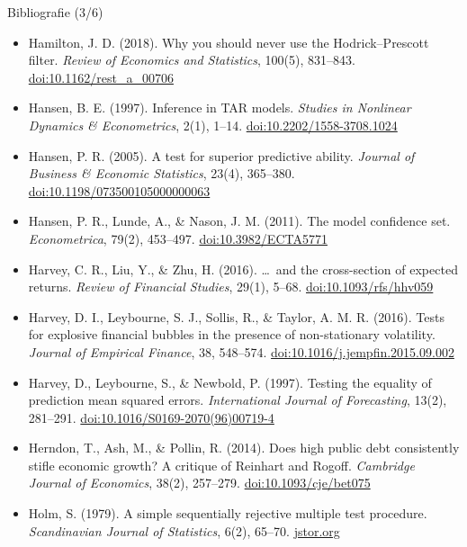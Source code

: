 \begin{frame}{Bibliografie (3/6)}
\itemsize{\tiny}
\begin{itemize}
    \item Hamilton, J. D. (2018). Why you should never use the Hodrick--Prescott filter. \textit{Review of Economics and Statistics}, 100(5), 831--843. \href{https://doi.org/10.1162/rest_a_00706}{doi:10.1162/rest\_a\_00706}
    \item Hansen, B. E. (1997). Inference in TAR models. \textit{Studies in Nonlinear Dynamics \& Econometrics}, 2(1), 1--14. \href{https://doi.org/10.2202/1558-3708.1024}{doi:10.2202/1558-3708.1024}
    \item Hansen, P. R. (2005). A test for superior predictive ability. \textit{Journal of Business \& Economic Statistics}, 23(4), 365--380. \href{https://doi.org/10.1198/073500105000000063}{doi:10.1198/073500105000000063}
    \item Hansen, P. R., Lunde, A., \& Nason, J. M. (2011). The model confidence set. \textit{Econometrica}, 79(2), 453--497. \href{https://doi.org/10.3982/ECTA5771}{doi:10.3982/ECTA5771}
    \item Harvey, C. R., Liu, Y., \& Zhu, H. (2016). \ldots\ and the cross-section of expected returns. \textit{Review of Financial Studies}, 29(1), 5--68. \href{https://doi.org/10.1093/rfs/hhv059}{doi:10.1093/rfs/hhv059}
    \item Harvey, D. I., Leybourne, S. J., Sollis, R., \& Taylor, A. M. R. (2016). Tests for explosive financial bubbles in the presence of non-stationary volatility. \textit{Journal of Empirical Finance}, 38, 548--574. \href{https://doi.org/10.1016/j.jempfin.2015.09.002}{doi:10.1016/j.jempfin.2015.09.002}
    \item Harvey, D., Leybourne, S., \& Newbold, P. (1997). Testing the equality of prediction mean squared errors. \textit{International Journal of Forecasting}, 13(2), 281--291. \href{https://doi.org/10.1016/S0169-2070(96)00719-4}{doi:10.1016/S0169-2070(96)00719-4}
    \item Herndon, T., Ash, M., \& Pollin, R. (2014). Does high public debt consistently stifle economic growth? A critique of Reinhart and Rogoff. \textit{Cambridge Journal of Economics}, 38(2), 257--279. \href{https://doi.org/10.1093/cje/bet075}{doi:10.1093/cje/bet075}
    \item Holm, S. (1979). A simple sequentially rejective multiple test procedure. \textit{Scandinavian Journal of Statistics}, 6(2), 65--70. \href{https://www.jstor.org/stable/4615733}{jstor.org}

\end{itemize}
\end{frame}
